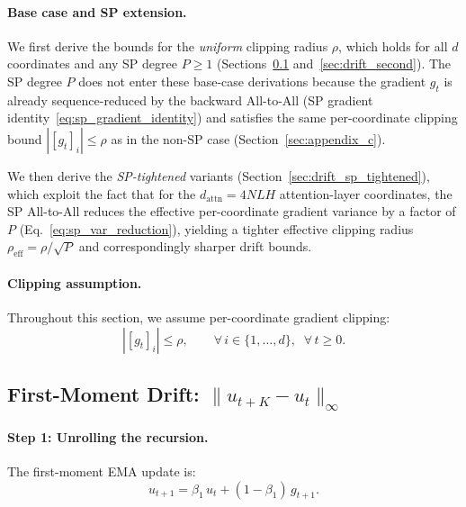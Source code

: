 \documentclass{article}
\begin{document}
\paragraph{Base case and SP extension.}
We first derive the bounds for the \emph{uniform} clipping radius $\rho$,
which holds for all $d$ coordinates and any SP degree $P \geq 1$
(Sections~\ref{sec:drift_first} and~\ref{sec:drift_second}).
The SP degree $P$ does not enter these base-case derivations because the gradient
$g_t$ is already sequence-reduced by the backward All-to-All
(SP gradient identity~\eqref{eq:sp_gradient_identity}) and
satisfies the same per-coordinate clipping bound $|[g_t]_i| \leq \rho$
as in the non-SP case (Section~\ref{sec:appendix_c}).

We then derive the \emph{SP-tightened} variants
(Section~\ref{sec:drift_sp_tightened}), which exploit the fact that for
the $d_{\text{attn}} = 4NLH$ attention-layer coordinates, the SP
All-to-All reduces the effective per-coordinate gradient variance by a factor
of $P$ (Eq.~\eqref{eq:sp_var_reduction}), yielding a tighter effective
clipping radius $\rho_{\text{eff}} = \rho/\sqrt{P}$ and correspondingly
sharper drift bounds.

\paragraph{Clipping assumption.}
Throughout this section, we assume per-coordinate gradient clipping:
\begin{equation}
|[g_t]_i| \leq \rho, \qquad \forall\, i \in \{1,\ldots,d\},\;\; \forall\, t \geq 0.
\label{eq:clip_assumption}
\end{equation}

\subsection{First-Moment Drift: \texorpdfstring{$\|u_{t+K}-u_t\|_\infty$}{||u(t+K)-u(t)|| infinity}}
\label{sec:drift_first}

\paragraph{Step 1: Unrolling the recursion.}

The first-moment EMA update is:
\begin{equation}
u_{t+1} = \beta_1\,u_t + (1-\beta_1)\,g_{t+1}.
\label{eq:drift_ema}
\end{equation}
\end{document}
